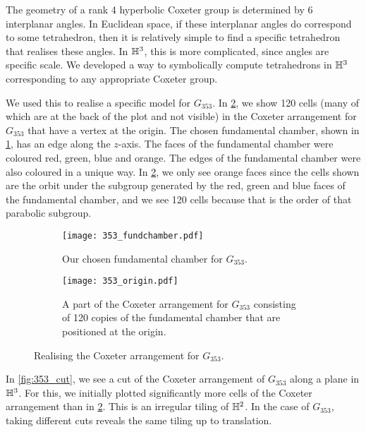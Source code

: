 The geometry of a rank 4 hyperbolic Coxeter group is determined by 6 interplanar angles.
In Euclidean space, if these interplanar angles do correspond to some tetrahedron, then it is relatively simple to find a specific tetrahedron that realises these angles.
In $\mathbb{H}^3$, this is more complicated, since angles are specific scale.
We developed a way to symbolically compute tetrahedrons in $\mathbb{H}^3$ corresponding to any appropriate Coxeter group.

We used this to realise a specific model for $G_{353}$.
In \cref{fig:353_origin}, we show 120  cells (many of which are at the back of the plot and not visible) in the Coxeter arrangement for $G_{353}$ that have a vertex at the origin.
The chosen fundamental chamber, shown in \cref{fig:353_fund_chamber}, has an edge along the $z$-axis.
The faces of the fundamental chamber were coloured red, green, blue and orange.
The edges of the fundamental chamber were also coloured in a unique way.
In \cref{fig:353_origin}, we only see orange faces since the cells shown are the orbit under the subgroup generated by the red, green and blue faces of the fundamental chamber, and we see 120 cells because that is the order of that parabolic subgroup.

\begin{figure}
	\centering
	\begin{subfigure}[t]{.45\textwidth}
		\centering
		\texttt{[image: 353\_fundchamber.pdf]}
		\caption{Our chosen fundamental chamber for $G_{353}$.}
		\label{fig:353_fund_chamber}
	\end{subfigure}
	\hspace{0.2ex}
	\begin{subfigure}[t]{.45\textwidth}
		\centering
		\texttt{[image: 353\_origin.pdf]}
		\caption{A part of the Coxeter arrangement for $G_{353}$ consisting of 120 copies of the fundamental chamber that are positioned at the origin.}
		\label{fig:353_origin}
	\end{subfigure}%
	\caption{Realising the Coxeter arrangement for $G_{353}$.}
	\label{fig:test}
\end{figure}

In \cref{fig:353_cut}, we see a cut of the Coxeter arrangement of $G_{353}$ along a plane in  $\mathbb{H}^3$.
For this, we initially plotted significantly more cells of the Coxeter arrangement than in  \cref{fig:353_origin}.
This is an irregular tiling of $\mathbb{H}^2$.
In the case of  $G_{353}$, taking different cuts reveals the same tiling up to translation.

